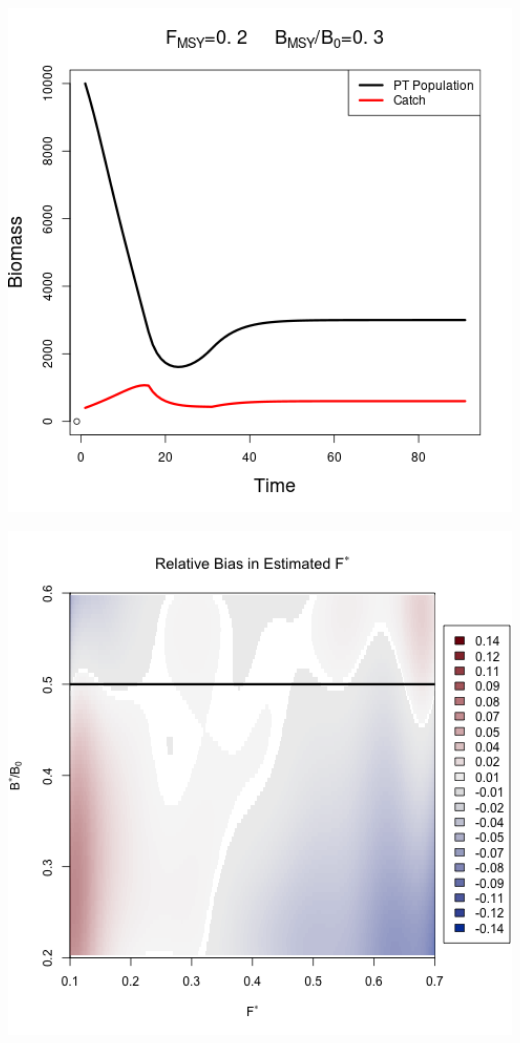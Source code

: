 \documentclass[ xcolor = pdftex, dvipsnames, table ]{beamer}
\begin{document}
\begin{frame}
{\begin{minipage}[h!]{0.325\textwidth}
\hspace*{-0.75cm}
\includegraphics[width=1.1\textwidth]{../../.././nick/gpBias/bioCatchExpT90X1Z0.3} %
\end{minipage}
\begin{minipage}[h!]{0.325\textwidth}
\hspace*{-0.25cm}
\includegraphics[width=1.1\textwidth]{../../.././nick/gpBias/fMSYRelBiasPellaExpT45.png}\\

\end{minipage}}
\end{frame}
\end{document}
